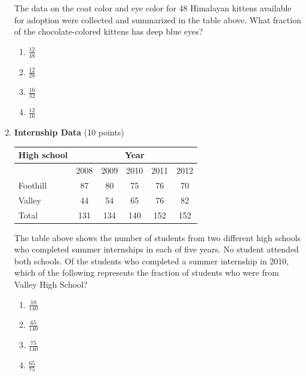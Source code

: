 \begin{enumerate}
  The data on the coat color and eye color for 48 Himalayan kittens available for adoption were collected and summarized in the table above. What fraction of the chocolate-colored kittens has deep blue eyes?
  \begin{enumerate}[label=(\Alph*)]
    \item $\frac{12}{48}$
    \item $\frac{12}{28}$
    \item $\frac{16}{32}$
    \item $\frac{12}{16}$
  \end{enumerate}
  \begin{subanswer}
  \end{subanswer}

  \item \textbf{Internship Data} (10 points)\\
  \begin{center}
  \begin{tabular}{|l|c|c|c|c|c|}
  \hline
  High school & \multicolumn{5}{|c|}{Year} \\
  \hline
  & 2008 & 2009 & 2010 & 2011 & 2012 \\
  \hline
  Foothill & 87 & 80 & 75 & 76 & 70 \\
  \hline
  Valley & 44 & 54 & 65 & 76 & 82 \\
  \hline
  Total & 131 & 134 & 140 & 152 & 152 \\
  \hline
  \end{tabular}
  \end{center}

  The table above shows the number of students from two different high schools who completed summer internships in each of five years. No student attended both schools. Of the students who completed a summer internship in 2010, which of the following represents the fraction of students who were from Valley High School?
  \begin{enumerate}[label=(\Alph*)]
    \item $\frac{10}{140}$
    \item $\frac{65}{140}$
    \item $\frac{75}{140}$
    \item $\frac{65}{75}$
  \end{enumerate}
  \begin{subanswer}
  \end{subanswer}

  \newpage


\end{enumerate}
